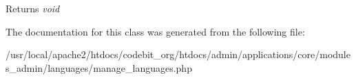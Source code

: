 \begin{DoxyReturn}{Returns}
{\itshape void} 
\end{DoxyReturn}


The documentation for this class was generated from the following file\-:\begin{DoxyCompactItemize}
\item 
/usr/local/apache2/htdocs/codebit\-\_\-org/htdocs/admin/applications/core/modules\-\_\-admin/languages/manage\-\_\-languages.\-php\end{DoxyCompactItemize}
